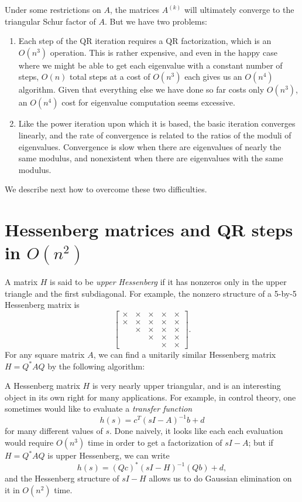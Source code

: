 \documentclass[12pt, leqno]{article} %
\begin{document}
Under some restrictions on $A$, the matrices $A^{(k)}$ will ultimately
converge to the triangular Schur factor of $A$.  But we have two problems:
\begin{enumerate}
\item
  Each step of the QR iteration requires a QR factorization, which is
  an $O(n^3)$ operation.  This is rather expensive, and even in the happy
  case where we might be able to get each eigenvalue with a constant
  number of steps, $O(n)$ total steps at a cost of $O(n^3)$ each gives
  us an $O(n^4)$ algorithm.  Given that everything else we have done
  so far costs only $O(n^3)$, an $O(n^4)$ cost for eigenvalue computation
  seems excessive.
\item
  Like the power iteration upon which it is based, the basic iteration
  converges linearly, and the rate of convergence is related to the
  ratios of the moduli of eigenvalues.  Convergence is slow when there
  are eigenvalues of nearly the same modulus, and nonexistent when
  there are eigenvalues with the same modulus.
\end{enumerate}
We describe next how to overcome these two difficulties.

\section{Hessenberg matrices and QR steps in $O(n^2)$}

A matrix $H$ is said to be {\em upper Hessenberg} if it has
nonzeros only in the upper triangle and the first subdiagonal.
For example, the nonzero structure of a 5-by-5 Hessenberg matrix
is
\[
  \begin{bmatrix}
    \times & \times & \times & \times & \times \\
    \times & \times & \times & \times & \times \\
           & \times & \times & \times & \times \\
           &        & \times & \times & \times \\
           &        &        & \times & \times
  \end{bmatrix}.
\]
For any square matrix $A$, we can find a unitarily similar Hessenberg
matrix $H = Q^* A Q$ by the following algorithm:


A Hessenberg matrix $H$ is very nearly upper triangular, and is an
interesting object in its own right for many applications.  For
example, in control theory, one sometimes would like to evaluate a
{\em transfer function}
\[
  h(s) = c^T (sI-A)^{-1} b + d
\]
for many different values of $s$.  Done naively, it looks like each
each evaluation would require $O(n^3)$ time in order to get a
factorization of $sI-A$; but if $H = Q^* A Q$ is upper Hessenberg, we
can write
\[
  h(s) = (Qc)^* (sI-H)^{-1} (Qb) + d,
\]
and the Hessenberg structure of $sI-H$ allows us to do Gaussian
elimination on it in $O(n^2)$ time.
\end{document}
